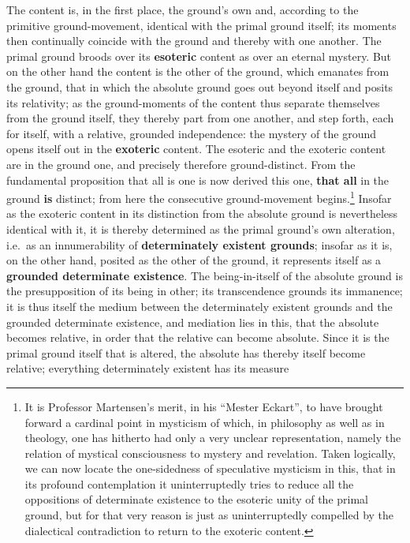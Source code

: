 \documentclass[12pt,a4paper,openany]{book}
\newcommand{\opage}[1]{\marginnote{\footnotesize\textit{[#1]}}}
\begin{document}
The content is, in the first place, the ground's own and, according to
the primitive ground-movement, identical with the primal ground
itself; its moments then continually coincide with the ground
and thereby with one another. The primal ground
broods over its \textbf{esoteric} content as over an eternal
mystery. But on the other hand the content is
the other of the ground, which emanates from the ground, that
in which the absolute ground goes out beyond itself and
posits its relativity; as the ground-moments of the content
thus separate themselves from the ground itself, they thereby part
from one another, and step forth, each
for itself, with a relative, grounded independence: the
mystery of the ground opens itself out in the \textbf{exoteric} content.
The esoteric and the exoteric content are in the ground
one, and precisely therefore ground-distinct. From the fundamental proposition
that all is one is now derived this one, \textbf{that all} in
the ground \textbf{is} distinct; from here the consecutive
ground-movement begins.\footnote{It is Professor Martensen's merit, in his ``Mester Eckart'', to have brought forward a cardinal point in mysticism of which, in philosophy as well as in theology, one has hitherto had only a very unclear representation, namely the relation of mystical consciousness to mystery and revelation. Taken logically, we can now locate the one-sidedness of speculative mysticism in this, that in its profound contemplation it uninterruptedly tries to reduce all the oppositions of determinate existence to the esoteric unity of the primal ground, but for that very reason is just as uninterruptedly compelled by the dialectical contradiction to return to the exoteric content.}
\setcounter{footnote}{0}%
\opage{133}Insofar as the exoteric content in its distinction from
the absolute ground is nevertheless identical with it, it is
thereby determined as the primal ground's own alteration, i.e.\ as
an innumerability of \textbf{determinately existent grounds}; insofar as it is,
on the other hand, posited as the other of the ground, it represents
itself as a \textbf{grounded determinate existence}. The being-in-itself
of the absolute ground is the presupposition of its being
in other; its transcendence grounds its immanence;
it is thus itself the medium between the determinately existent
grounds and the grounded determinate existence, and mediation
lies in this, that the absolute becomes relative,
in order that the relative can become absolute. Since it is the primal ground
itself that is altered, the absolute has thereby
itself become relative; everything determinately existent has its measure
\end{document}
